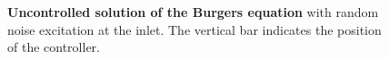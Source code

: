 \begin{figure}
\centering
\caption{\textbf{Uncontrolled solution of the Burgers equation} with random noise excitation at the inlet. The vertical bar indicates the position of the controller.}
\label{fig:burgers_free}
\end{figure} 
